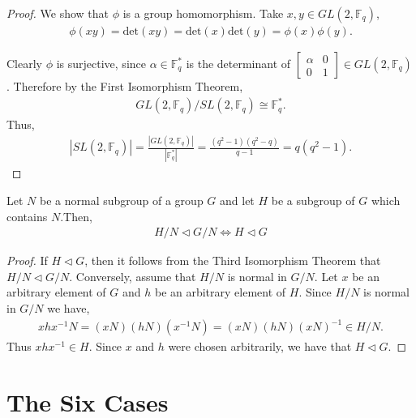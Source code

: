 \begin{proof}
We show that $\phi$ is a group homomorphism. Take $x,y \in GL(2,\mathbb{F}_q)$,
\begin{align*} 
\phi(xy) = \text{det}(xy) = \text{det}(x) \text{det}(y) = \phi(x) \phi(y).
\end{align*}

Clearly $\phi$ is surjective, since $\alpha \in \mathbb{F}^*_q$ is the determinant of $\begin{bmatrix} \alpha & 0 \\ 0 & 1 \end{bmatrix} \in GL(2,\mathbb{F}_q)$. Therefore by the First Isomorphism Theorem,
\begin{align*} GL(2,\mathbb{F}_q) / SL(2,\mathbb{F}_q) \cong \mathbb{F}^*_q.
\end{align*}
Thus,
\begin{align*} |SL(2,\mathbb{F}_q)| =  \frac{|GL(2,\mathbb{F}_q)|}{|\mathbb{F}^*_q|} = \frac{(q^2-1)(q^2-q)}{q-1} = q(q^2-1).
\end{align*}

\end{proof}

\begin{lemma}\label{normalquotient} Let $N$ be a normal subgroup of a group $G$ and let $H$ be a subgroup of $G$ which contains $N$.Then,
\begin{align*} H / N \vartriangleleft G / N \iff H \vartriangleleft G
\end{align*} 
\end{lemma}

\begin{proof} If $H \vartriangleleft G$, then it follows from the Third Isomorphism Theorem that $ H / N \vartriangleleft G / N$. Conversely, assume that $H / N$ is normal in $G / N$. Let $x$ be an arbitrary element of $G$ and $h$ be an arbitrary element of $H$. Since $H / N$ is normal in $G / N$ we have,
\begin{align*} x h x^{-1}N = (xN)(hN)(x^{-1}N) = (xN)(hN)(xN)^{-1} \in H / N.
\end{align*}
Thus $x h x^{-1} \in H$. Since $x$ and $h$ were chosen arbitrarily, we have that $H \vartriangleleft G$.

\end{proof}

\section {The Six Cases}


